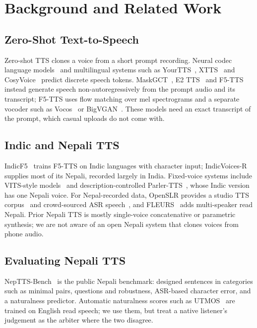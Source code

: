 \section{Background and Related Work}

\subsection{Zero-Shot Text-to-Speech}
Zero-shot TTS clones a voice from a short prompt recording. Neural codec language models~\citep{valle} and multilingual systems such as YourTTS~\citep{yourtts}, XTTS~\citep{xtts} and CosyVoice~\citep{cosyvoice} predict discrete speech tokens. MaskGCT~\citep{maskgct}, E2 TTS~\citep{e2tts} and F5-TTS~\citep{f5} instead generate speech non-autoregressively from the prompt audio and its transcript; F5-TTS uses flow matching over mel spectrograms and a separate vocoder such as Vocos~\citep{vocos} or BigVGAN~\citep{bigvgan}. These models need an exact transcript of the prompt, which casual uploads do not come with.

\subsection{Indic and Nepali TTS}
IndicF5~\citep{indicf5} trains F5-TTS on Indic languages with character input; IndicVoices-R~\citep{indicvoicesr} supplies most of its Nepali, recorded largely in India. Fixed-voice systems include VITS-style models~\citep{vits} and description-controlled Parler-TTS~\citep{parler}, whose Indic version~\citep{indicparler} has one Nepali voice. For Nepal-recorded data, OpenSLR provides a studio TTS corpus~\citep{slr43} and crowd-sourced ASR speech~\citep{slr54}, and FLEURS~\citep{fleurs} adds multi-speaker read Nepali. Prior Nepali TTS is mostly single-voice concatenative or parametric synthesis; we are not aware of an open Nepali system that clones voices from phone audio.

\subsection{Evaluating Nepali TTS}
NepTTS-Bench~\citep{neptts} is the public Nepali benchmark: designed sentences in categories such as minimal pairs, questions and robustness, ASR-based character error, and a naturalness predictor. Automatic naturalness scores such as UTMOS~\citep{utmos} are trained on English read speech; we use them, but treat a native listener's judgement as the arbiter where the two disagree.
